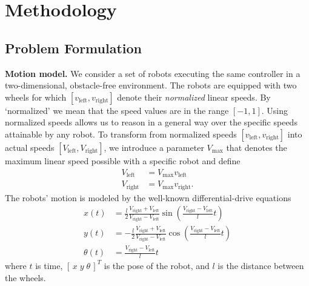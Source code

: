 \documentclass[conference]{IEEEtran}
\newcommand{\myparagraph}[1]{\textbf{#1.}}
\begin{document}

\section{Methodology}

\subsection{Problem Formulation}

\newcommand{\vL}{\ensuremath{v_{\text{left}}}}
\newcommand{\vR}{\ensuremath{v_{\text{right}}}}
\newcommand{\vaL}{\ensuremath{V_{\text{left}}}}
\newcommand{\vaR}{\ensuremath{V_{\text{right}}}}
\newcommand{\VM}{\ensuremath{V_{\text{max}}}}
\myparagraph{Motion model}
We consider a set of robots executing the same controller in a two-dimensional,
obstacle-free environment. The robots are equipped with two wheels for which
$[\vL,\vR]$ denote their \emph{normalized} linear speeds. By `normalized' we
mean that the speed values are in the range $[-1, 1]$. Using normalized speeds
allows us to reason in a general way over the specific speeds attainable by any
robot. To transform from normalized speeds $[\vL,\vR]$ into actual speeds
$[\vaL,\vaR]$, we introduce a parameter $\VM$ that denotes the maximum linear
speed possible with a specific robot and define
\begin{align}
  \vaL &= \VM \vL\\
  \vaR &= \VM \vR.
\end{align}
The robots' motion is modeled by the well-known differential-drive
equations~\cite{Dudek2010}
\begin{equation}
  \label{eq:diffdrive}
  \begin{aligned}
    x(t)      &=  \frac{l}{2}\frac{\vaR+\vaL}{\vaR-\vaL}\sin\left(\frac{\vaR-\vaL}{l}t\right)\\
    y(t)      &= -\frac{l}{2}\frac{\vaR+\vaL}{\vaR-\vaL}\cos\left(\frac{\vaR-\vaL}{l}t\right)\\
    \theta(t) &=  \frac{\vaR-\vaL}{l}t
  \end{aligned}
\end{equation}
where $t$ is time, $[\,x\;y\;\theta\,]^T$ is the pose of the robot, and $l$ is
the distance between the wheels.
\end{document}
